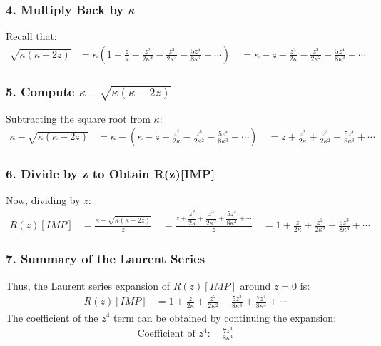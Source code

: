 \subsubsection*{4. Multiply Back by  $\kappa$ }

Recall that:
\begin{align}
\sqrt{\kappa(\kappa - 2z)} &= \kappa \left( 1 - \frac{z}{\kappa} - \frac{z^2}{2\kappa^2} - \frac{z^3}{2\kappa^3} - \frac{5z^4}{8\kappa^4} - \cdots \right) \
&= \kappa - z - \frac{z^2}{2\kappa} - \frac{z^3}{2\kappa^2} - \frac{5z^4}{8\kappa^3} - \cdots
\end{align}

\subsubsection*{5. Compute  $\kappa - \sqrt{\kappa(\kappa - 2z)}$ }

Subtracting the square root from  $\kappa$:
\begin{align}
\kappa - \sqrt{\kappa(\kappa - 2z)} &= \kappa - \left( \kappa - z - \frac{z^2}{2\kappa} - \frac{z^3}{2\kappa^2} - \frac{5z^4}{8\kappa^3} - \cdots \right) \
&= z + \frac{z^2}{2\kappa} + \frac{z^3}{2\kappa^2} + \frac{5z^4}{8\kappa^3} + \cdots
\end{align}

\subsubsection*{6. Divide by  z  to Obtain  R(z)[IMP] }

Now, dividing by  $z$:
\begin{align}
R(z)[IMP] &= \frac{\kappa - \sqrt{\kappa(\kappa - 2z)}}{z} \
&= \frac{ z + \dfrac{z^2}{2\kappa} + \dfrac{z^3}{2\kappa^2} + \dfrac{5z^4}{8\kappa^3} + \cdots }{ z } \
&= 1 + \frac{z}{2\kappa} + \frac{z^2}{2\kappa^2} + \frac{5z^3}{8\kappa^3} + \cdots
\end{align}

\subsubsection*{7. Summary of the Laurent Series}

Thus, the Laurent series expansion of  $R(z)[IMP]$  around  $z=0$ is:
\begin{align}
R(z)[IMP] &= 1 + \frac{z}{2\kappa} + \frac{z^2}{2\kappa^2} + \frac{5z^3}{8\kappa^3} + \frac{7z^4}{8\kappa^4} + \cdots
\end{align}
The coefficient of the  $z^4$  term can be obtained by continuing the expansion:
\begin{align}
\text{Coefficient of } z^4: \quad \frac{7z^4}{8\kappa^4}
\end{align}

